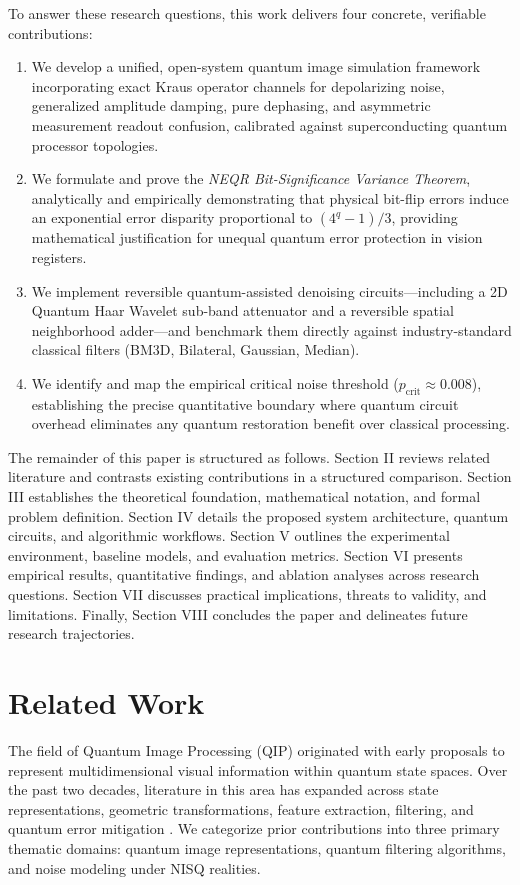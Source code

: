 \documentclass[12pt,onecolumn,draftclsnofoot]{IEEEtran}
\begin{document}
To answer these research questions, this work delivers four concrete, verifiable contributions:
\begin{enumerate}
    \item We develop a unified, open-system quantum image simulation framework incorporating exact Kraus operator channels for depolarizing noise, generalized amplitude damping, pure dephasing, and asymmetric measurement readout confusion, calibrated against superconducting quantum processor topologies.
    \item We formulate and prove the \textit{NEQR Bit-Significance Variance Theorem}, analytically and empirically demonstrating that physical bit-flip errors induce an exponential error disparity proportional to $(4^q - 1)/3$, providing mathematical justification for unequal quantum error protection in vision registers.
    \item We implement reversible quantum-assisted denoising circuits—including a 2D Quantum Haar Wavelet sub-band attenuator and a reversible spatial neighborhood adder—and benchmark them directly against industry-standard classical filters (BM3D, Bilateral, Gaussian, Median).
    \item We identify and map the empirical critical noise threshold ($p_{\text{crit}} \approx 0.008$), establishing the precise quantitative boundary where quantum circuit overhead eliminates any quantum restoration benefit over classical processing.
\end{enumerate}

The remainder of this paper is structured as follows. Section II reviews related literature and contrasts existing contributions in a structured comparison. Section III establishes the theoretical foundation, mathematical notation, and formal problem definition. Section IV details the proposed system architecture, quantum circuits, and algorithmic workflows. Section V outlines the experimental environment, baseline models, and evaluation metrics. Section VI presents empirical results, quantitative findings, and ablation analyses across research questions. Section VII discusses practical implications, threats to validity, and limitations. Finally, Section VIII concludes the paper and delineates future research trajectories.

\section{Related Work}
The field of Quantum Image Processing (QIP) originated with early proposals to represent multidimensional visual information within quantum state spaces. Over the past two decades, literature in this area has expanded across state representations, geometric transformations, feature extraction, filtering, and quantum error mitigation \cite{le2011flexible, zhang2013neqr, yao2017quantum, jiang2015quantum, caraiman2014histogram, yan2016quantum}. We categorize prior contributions into three primary thematic domains: quantum image representations, quantum filtering algorithms, and noise modeling under NISQ realities.
\end{document}
